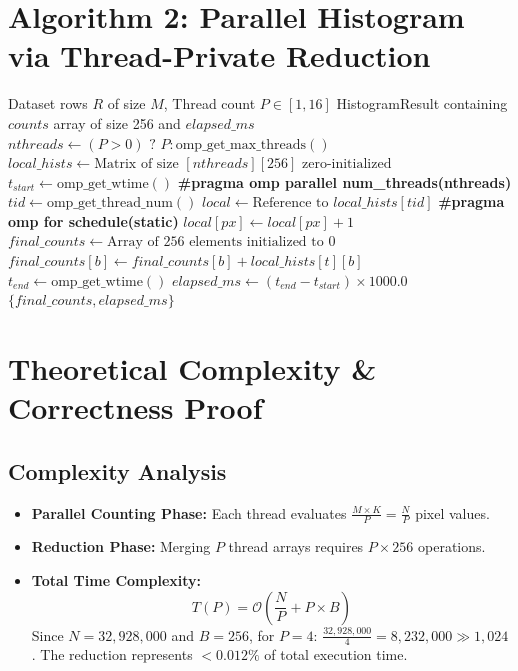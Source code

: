 \documentclass[12pt,a4paper,oneside]{report}
\begin{document}
\section{Algorithm 2: Parallel Histogram via Thread-Private Reduction}

\begin{algorithm}[h!]
\caption{Parallel Histogram via Thread-Private Reduction}
\label{alg:parallel}
\begin{algorithmic}[1]
\Require Dataset rows $R$ of size $M$, Thread count $P \in [1, 16]$
\Ensure HistogramResult containing $counts$ array of size 256 and $elapsed\_ms$
\State $nthreads \gets (P > 0) \text{ ? } P : \text{omp\_get\_max\_threads}()$
\State $local\_hists \gets \text{Matrix of size } [nthreads][256] \text{ zero-initialized}$
\State $t_{start} \gets \text{omp\_get\_wtime}()$
\Statex
\State \textbf{\#pragma omp parallel num\_threads(nthreads)}
\State \Begin
    \State $tid \gets \text{omp\_get\_thread\_num}()$
    \State $local \gets \text{Reference to } local\_hists[tid]$
    \Statex {}
    \State \textbf{\#pragma omp for schedule(static)}
            \State $local[px] \gets local[px] + 1$ 
        \EndFor
    \EndFor
\State \End {}
\Statex
\State $final\_counts \gets \text{Array of 256 elements initialized to } 0$
        \State $final\_counts[b] \gets final\_counts[b] + local\_hists[t][b]$
    \EndFor
\EndFor
\State $t_{end} \gets \text{omp\_get\_wtime}()$
\State $elapsed\_ms \gets (t_{end} - t_{start}) \times 1000.0$
\State \Return $\{ final\_counts, elapsed\_ms \}$
\end{algorithmic}
\end{algorithm}

\section{Theoretical Complexity \& Correctness Proof}

\subsection{Complexity Analysis}
\begin{itemize}
    \item \textbf{Parallel Counting Phase:} Each thread evaluates $\frac{M \times K}{P} = \frac{N}{P}$ pixel values.
    \item \textbf{Reduction Phase:} Merging $P$ thread arrays requires $P \times 256$ operations.
    \item \textbf{Total Time Complexity:}
    \begin{equation}
        T(P) = \mathcal{O}\left(\frac{N}{P} + P \times B\right)
    \end{equation}
    Since $N = 32,928,000$ and $B = 256$, for $P=4$: $\frac{32,928,000}{4} = 8,232,000 \gg 1,024$. The reduction represents $<0.012\%$ of total execution time.
\end{itemize}
\end{document}
